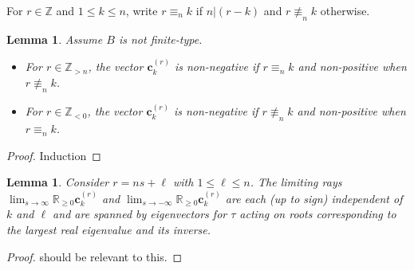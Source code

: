 \documentclass{amsart}
\newtheorem{lemma}[theorem]{Lemma}
\numberwithin{theorem}{section}
\newcommand{\bfc}{\boldsymbol{c}}
\newcommand{\RR}{\mathbb{R}}
\newcommand{\ZZ}{\mathbb{Z}}
\begin{document}
  For $r\in\ZZ$ and $1\le k\le n$, write $r\equiv_n k$ if $n|(r-k)$ and $r\not\equiv_n k$ otherwise.
  \begin{lemma}
    \label{lem:tropical signs}
    Assume $B$ is not finite-type.
    \begin{itemize}
      \item For $r\in\ZZ_{>n}$, the vector $\bfc^{(r)}_k$ is non-negative if $r\equiv_n k$ and non-positive when $r\not\equiv_n k$.
      \item For $r\in\ZZ_{<0}$, the vector $\bfc^{(r)}_k$ is non-negative if $r\not\equiv_n k$ and non-positive when $r\equiv_n k$.
    \end{itemize}
  \end{lemma}
  \begin{proof}
    Induction
  \end{proof}

  \begin{lemma}
    Consider $r=ns+\ell$ with $1\le\ell\le n$.
    The limiting rays $\lim_{s\to\infty} \RR_{\ge0}\bfc^{(r)}_k$ and $\lim_{s\to-\infty} \RR_{\ge0}\bfc^{(r)}_k$ are each (up to sign) independent of $k$ and $\ell$ and are spanned by eigenvectors for $\tau$ acting on roots corresponding to the largest real eigenvalue and its inverse.
  \end{lemma}
  \begin{proof}
    \cite{Tak94} should be relevant to this.
  \end{proof}
\end{document}
